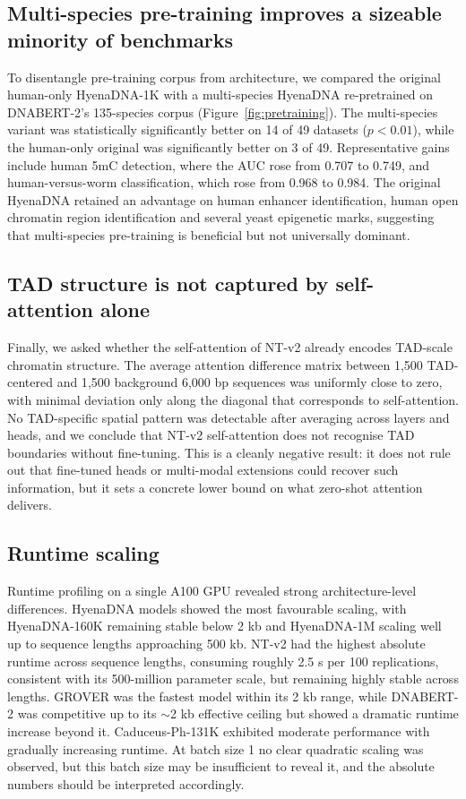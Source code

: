 \documentclass[11pt,a4paper]{article}
\begin{document}
\subsection{Multi-species pre-training improves a sizeable minority of benchmarks}
To disentangle pre-training corpus from architecture, we compared the original human-only HyenaDNA-1K with a multi-species HyenaDNA re-pretrained on DNABERT-2's 135-species corpus (Figure~\ref{fig:pretraining}). The multi-species variant was statistically significantly better on 14 of 49 datasets ($p < 0.01$), while the human-only original was significantly better on 3 of 49. Representative gains include human 5mC detection, where the AUC rose from 0.707 to 0.749, and human-versus-worm classification, which rose from 0.968 to 0.984. The original HyenaDNA retained an advantage on human enhancer identification, human open chromatin region identification and several yeast epigenetic marks, suggesting that multi-species pre-training is beneficial but not universally dominant.

\subsection{TAD structure is not captured by self-attention alone}
Finally, we asked whether the self-attention of NT-v2 already encodes TAD-scale chromatin structure. The average attention difference matrix between 1{,}500 TAD-centered and 1{,}500 background 6{,}000 bp sequences was uniformly close to zero, with minimal deviation only along the diagonal that corresponds to self-attention. No TAD-specific spatial pattern was detectable after averaging across layers and heads, and we conclude that NT-v2 self-attention does not recognise TAD boundaries without fine-tuning. This is a cleanly negative result: it does not rule out that fine-tuned heads or multi-modal extensions could recover such information, but it sets a concrete lower bound on what zero-shot attention delivers.

\subsection{Runtime scaling}
Runtime profiling on a single A100 GPU revealed strong architecture-level differences. HyenaDNA models showed the most favourable scaling, with HyenaDNA-160K remaining stable below 2 kb and HyenaDNA-1M scaling well up to sequence lengths approaching 500 kb. NT-v2 had the highest absolute runtime across sequence lengths, consuming roughly 2.5 s per 100 replications, consistent with its 500-million parameter scale, but remaining highly stable across lengths. GROVER was the fastest model within its 2 kb range, while DNABERT-2 was competitive up to its $\sim$2 kb effective ceiling but showed a dramatic runtime increase beyond it. Caduceus-Ph-131K exhibited moderate performance with gradually increasing runtime. At batch size 1 no clear quadratic scaling was observed, but this batch size may be insufficient to reveal it, and the absolute numbers should be interpreted accordingly.
\end{document}
